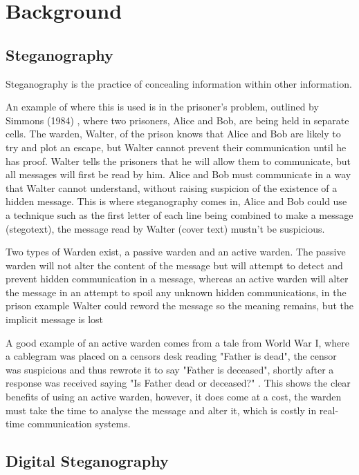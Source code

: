 \chapter{Background}
\label{ch:background}

\section{Steganography}

Steganography is the practice of concealing information within other information.

An example of where this is used is in the prisoner's problem, outlined by Simmons (1984) \cite{SIMMONS}, where two prisoners, Alice and Bob, are being held in separate cells. The warden, Walter, of the prison knows that Alice and Bob are likely to try and plot an escape, but Walter cannot prevent their communication until he has proof. Walter tells the prisoners that he will allow them to communicate, but all messages will first be read by him. Alice and Bob must communicate in a way that Walter cannot understand, without raising suspicion of the existence of a hidden message. This is where steganography comes in, Alice and Bob could use a technique such as the first letter of each line being combined to make a message (stegotext), the message read by Walter (cover text) mustn't be suspicious.

Two types of Warden exist, a passive warden and an active warden. The passive warden will not alter the content of the message but will attempt to detect and prevent hidden communication in a message, whereas an active warden will alter the message in an attempt to spoil any unknown hidden communications, in the prison example Walter could reword the message so the meaning remains, but the implicit message is lost \cite{aSoCaSaAWA}

A good example of an active warden comes from a tale from World War I, where a cablegram was placed on a censors desk reading "Father is dead", the censor was suspicious and thus rewrote it to say "Father is deceased", shortly after a response was received saying "Is Father dead or deceased?" \cite{TCTSoSW}. This shows the clear benefits of using an active warden, however, it does come at a cost, the warden must take the time to analyse the message and alter it, which is costly in real-time communication systems.

\section{Digital Steganography}

